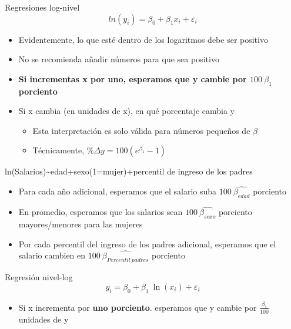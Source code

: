 \documentclass[
  ignorenonframetext,
]{beamer}
\providecommand{\tightlist}{%
  \setlength{\itemsep}{0pt}\setlength{\parskip}{0pt}}
\begin{document}
\begin{frame}{Regresiones log-nivel}
\protect\hypertarget{regresiones-log-nivel}{}
\[ln(y_i)=\beta_0+\beta_1 x_i+\varepsilon_i\]

\begin{itemize}
\tightlist
\item
  Evidentemente, lo que esté dentro de los logaritmos debe ser positivo
\item
  No se recomienda añadir números para que sea positivo
\item
  \textbf{Si incrementas x por uno, esperamos que y cambie por
  \(100 \ \beta_1\) porciento}
\item
  Si x cambia (en unidades de x), en qué porcentaje cambia y

  \begin{itemize}
  \tightlist
  \item
    Esta interpretación es solo válida para números pequeños de
    \(\beta\)
  \item
    Técnicamente, \(\% \Delta y= 100 (e^{\beta_1}-1)\)
  \end{itemize}
\end{itemize}
\end{frame}

\begin{frame}{}
\protect\hypertarget{section-48}{}
ln(Salarios)\textasciitilde edad+sexo(1=mujer)+percentil de ingreso de
los padres

\begin{itemize}
\item
  Para cada año adicional, esperamos que el salario suba
  \(100 \ \hat{\beta_{edad}}\) porciento
\item
  En promedio, esperamos que los salarios sean
  \(100\ \hat{\beta_{sexo}}\) porciento mayores/menores para las mujeres
\item
  Por cada percentil del ingreso de los padres adicional, esperamos que
  el salario cambien en \(100 \ \hat{\beta_{Percentil \ padres}}\)
  porciento
\end{itemize}
\end{frame}

\begin{frame}{Regresión nivel-log}
\protect\hypertarget{regresiuxf3n-nivel-log}{}
\[y_i=\beta_0+ \beta_1 \ \ln(x_i)+\varepsilon_i\]

\begin{itemize}
\tightlist
\item
  Si x incrementa por \textbf{uno porciento}. esperamos que y cambie por
  \(\frac{\beta_1}{100}\) unidades de y
\end{itemize}
\end{frame}
\end{document}
